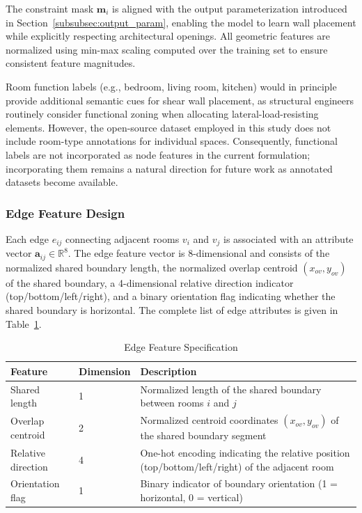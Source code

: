 The constraint mask $\mathbf{m}_i$ is aligned with the output parameterization introduced in Section~\ref{subsubsec:output_param}, enabling the model to learn wall placement while explicitly respecting architectural openings.
All geometric features are normalized using min-max scaling computed over the training set to ensure consistent feature magnitudes.

Room function labels (e.g., bedroom, living room, kitchen) would in principle provide additional semantic cues for shear wall placement, as structural engineers routinely consider functional zoning when allocating lateral-load-resisting elements.
However, the open-source dataset employed in this study does not include room-type annotations for individual spaces.
Consequently, functional labels are not incorporated as node features in the current formulation; incorporating them remains a natural direction for future work as annotated datasets become available.

\subsubsection{Edge Feature Design}
\label{subsubsec:edge_features}

Each edge $e_{ij}$ connecting adjacent rooms $v_i$ and $v_j$ is associated with an attribute vector $\mathbf{a}_{ij} \in \mathbb{R}^{8}$.
The edge feature vector is 8-dimensional and consists of the normalized shared boundary length, the normalized overlap centroid $(x_{ov},y_{ov})$ of the shared boundary, a 4-dimensional relative direction indicator (top/bottom/left/right), and a binary orientation flag indicating whether the shared boundary is horizontal.
The complete list of edge attributes is given in Table~\ref{tab:edge_features}.

\begin{table}[t]
\centering
\caption{Edge Feature Specification}
\label{tab:edge_features}
\small
\begin{tabularx}{\columnwidth}{llX}
\toprule
Feature & Dimension & Description \\\midrule
Shared length & 1 & Normalized length of the shared boundary between rooms $i$ and $j$ \\
Overlap centroid & 2 & Normalized centroid coordinates $(x_{ov}, y_{ov})$ of the shared boundary segment \\
Relative direction & 4 & One-hot encoding indicating the relative position (top/bottom/left/right) of the adjacent room \\
Orientation flag & 1 & Binary indicator of boundary orientation (1 = horizontal, 0 = vertical) \\
\bottomrule
\end{tabularx}
\end{table}

